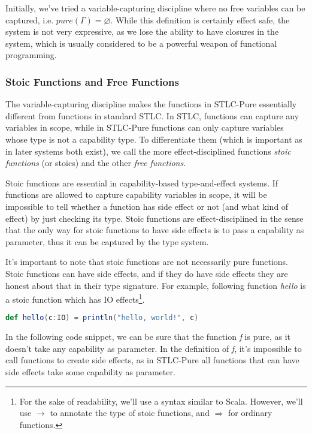 Initially, we've tried a variable-capturing discipline where no free
variables can be captured, i.e. $pure(\Gamma) = \varnothing$. While
this definition is certainly effect safe, the system is not very
expressive, as we lose the ability to have closures in the system,
which is usually considered to be a powerful weapon of functional
programming.

\subsubsection{Stoic Functions and Free Functions}

The variable-capturing discipline makes the functions in STLC-Pure
essentially different from functions in standard STLC. In STLC,
functions can capture any variables in scope, while in STLC-Pure
functions can only capture variables whose type is not a capability
type. To differentiate them (which is important as in later systems
both exist), we call the more effect-disciplined functions \emph{stoic
  functions} (or stoics) and the other \emph{free functions}.

Stoic functions are essential in capability-based type-and-effect
systems. If functions are allowed to capture capability variables in
scope, it will be impossible to tell whether a function has side
effect or not (and what kind of effect) by just checking its
type. Stoic functions are effect-disciplined in the sense that the
only way for stoic functions to have side effects is to pass a
capability as parameter, thus it can be captured by the type system.

It's important to note that stoic functions are not necessarily pure
functions. Stoic functions can have side effects, and if they do have
side effects they are honest about that in their type signature. For
example, following function \emph{hello} is a stoic function which has
IO effects\footnote{For the sake of readability, we'll use a syntax
  similar to Scala. However, we'll use $\to$ to annotate the type of
  stoic functions, and $\Rightarrow$ for ordinary functions.}.

\begin{lstlisting}[language=Scala]
  def hello(c:IO) = println("hello, world!", c)
\end{lstlisting}

In the following code snippet, we can be sure that the function
\emph{f} is pure, as it doesn't take any capability as parameter. In
the definition of \emph{f}, it's impossible to call functions to
create side effects, as in STLC-Pure all functions that can have side
effects take some capability as parameter.

